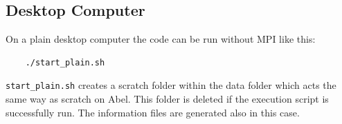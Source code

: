 \documentclass[10pt,a4paper]{article}
\begin{document}
\subsection{Desktop Computer}
On a plain desktop computer the code can be run without MPI like this:

\begin{lstlisting}
	./start_plain.sh
\end{lstlisting}

\lstinline$start_plain.sh$ creates a scratch folder within the data folder which acts the same way as scratch on Abel. This folder is deleted if the execution script is successfully run. The information files are generated also in this case.
\end{document}
